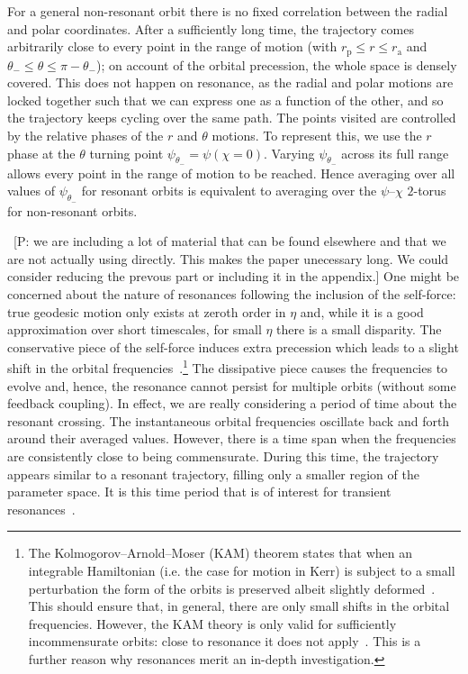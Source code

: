 \documentclass[aps,prd,amsfonts,amssymb,amsmath,nofootinbib,showpacs,superscriptaddress,twocolumn,floatfix]{revtex4-1}
\newcommand{\sub}[1]{\ensuremath{_\mathrm{#1}}}
\newcommand{\pcm}[1]{{\color{blue}~\textsf{[P: #1]}}}
\begin{document}
For a general non-resonant orbit there is no fixed correlation between the radial and polar coordinates. After a sufficiently long time, the trajectory comes arbitrarily close to every point in the range of motion (with $r\sub{p} \leq r \leq r\sub{a}$ and $\theta_- \leq \theta \leq \pi - \theta_-$); on account of the orbital precession, the whole space is densely covered. This does not happen on resonance, as the radial and polar motions are locked together such that we can express one as a function of the other, and so the trajectory keeps cycling over the same path. The points visited are controlled by the relative phases of the $r$ and $\theta$ motions. To represent this, we use the $r$ phase at the $\theta$ turning point $\psi_{\theta_-} = \psi(\chi = 0)$. Varying $\psi_{\theta_-}$ across its full range allows every point in the range of motion to be reached. Hence averaging over all values of $\psi_{\theta_-}$ for resonant orbits is equivalent to averaging over the $\psi$--$\chi$ $2$-torus for non-resonant orbits.


\pcm{we are including a lot of material that can be found elsewhere and that we are not actually using directly. This makes the paper unecessary long. We could consider reducing the prevous part or including it in the appendix.}
One might be concerned about the nature of resonances following the inclusion of the self-force: true geodesic motion only exists at zeroth order in $\eta$ and, while it is a good approximation over short timescales, for small $\eta$ there is a small disparity. The conservative piece of the self-force induces extra precession which leads to a slight shift in the orbital frequencies~\cite{Warburton2012}.\footnote{The Kolmogorov--Arnold--Moser (KAM) theorem states that when an integrable Hamiltonian (i.e. the case for motion in Kerr) is subject to a small perturbation the form of the orbits is preserved albeit slightly deformed~\cite{Arnold1963,Moser1973}. %
This should ensure that, in general, there are only small shifts in the orbital frequencies. However, the KAM theory is only valid for sufficiently incommensurate orbits: close to resonance it does not apply~\cite{Moser1973}. %
This is a further reason why resonances merit an in-depth investigation.}
The dissipative piece causes the frequencies to evolve and, hence, the resonance cannot persist for multiple orbits (without some feedback coupling). In effect, we are really considering a period of time about the resonant crossing. The instantaneous orbital frequencies oscillate back and forth around their averaged values. However, there is a time span when the frequencies are consistently close to being commensurate. During this time, the trajectory appears similar to a resonant trajectory, filling only a smaller region of the parameter space. It is this time period that is of interest for transient resonances~\cite{Bosley1992}.
\end{document}
